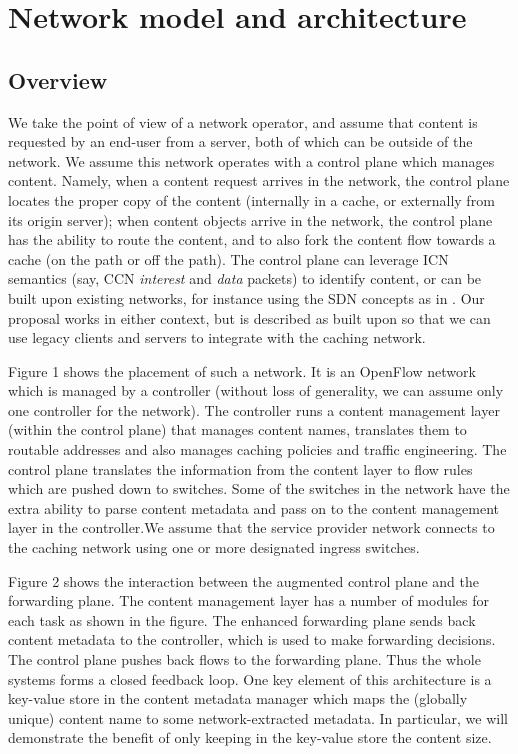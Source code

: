 \documentclass[conference]{IEEEtran}
\begin{document}
\section{Network model and architecture}
\label{sec:network}
\subsection{Overview}
We take the point of view of a network operator, and assume
that content is requested by an end-user from a server, both of
which can be outside of the network. We assume this network
operates with a control plane which manages content. Namely,
when a content request arrives in the network, the control
plane locates the proper copy of the content (internally in
a cache, or externally from its origin server); when content
objects arrive in the network, the control plane has the ability
to route the content, and to also fork the content flow towards
a cache (on the path or off the path). The control plane can
leverage ICN semantics (say, CCN \emph{interest} and \emph{data} packets)
to identify content, or can be built upon existing networks,
for instance using the SDN concepts as in \cite{Chanda12}. Our proposal
works in either context, but is described as built upon \cite{Chanda12} so
that we can use legacy clients and servers to integrate with
the caching network.

Figure 1 shows the placement of such a network. It is
an OpenFlow network which is managed by a controller
(without loss of generality, we can assume only one controller
for the network). The controller runs a content management
layer (within the control plane) that manages content names,
translates them to routable addresses and also manages caching
policies and traffic engineering. The control plane translates
the information from the content layer to flow rules which are
pushed down to switches. Some of the switches in the network
have the extra ability to parse content metadata and pass on to
the content management layer in the controller.We assume that
the service provider network connects to the caching network
using one or more designated ingress switches.

Figure 2 shows the interaction between the augmented
control plane and the forwarding plane. The content management
layer has a number of modules for each task as
shown in the figure. The enhanced forwarding plane sends
back content metadata to the controller, which is used to
make forwarding decisions. The control plane pushes back
flows to the forwarding plane. Thus the whole systems forms
a closed feedback loop. One key element of this architecture is
a key-value store in the content metadata manager which maps
the (globally unique) content name to some network-extracted
metadata. In particular, we will demonstrate the benefit of only
keeping in the key-value store the content size.
\end{document}

